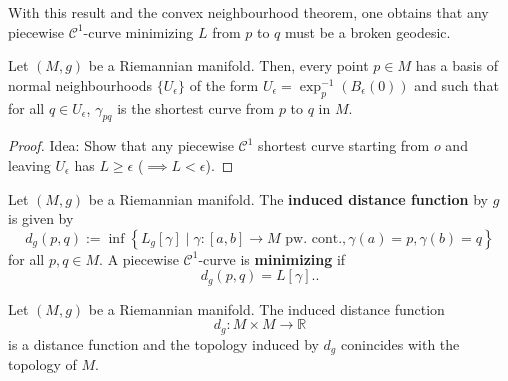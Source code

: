 With this result and the convex neighbourhood theorem, one obtains that any piecewise $\mathcal{C}^1$-curve minimizing $L$ from $p$ to $q$ must be a broken geodesic.
\begin{theorem}
    Let $(M,g)$ be a Riemannian manifold. Then, every point $p\in M$ has a basis of normal neighbourhoods $\{U_\epsilon\}$ of the form $U_\epsilon = \exp_p^{-1}(B_\epsilon(0))$ and such that for all $q \in U_\epsilon$, $\gamma_{pq}$ is the shortest curve from $p$ to $q$ in $M$.
\end{theorem}
\begin{proof}
    Idea: Show that any piecewise $\mathcal{C}^1$ shortest curve starting from $o$ and leaving $U_\epsilon$ has $L \geq \epsilon$ ($\implies L < \epsilon$).
\end{proof}
\begin{definition}
   Let $(M,g)$ be a Riemannian manifold. The \textbf{induced distance function} by $g$ is given by \[
       d_g(p,q):=\inf \left\{ L_g[\gamma] \mid \gamma: [a,b] \to M \text{ pw. cont.,} \, \gamma(a)=p, \gamma(b)=q\right\}
   \] for all $p,q \in M$. A piecewise $\mathcal{C}^1$-curve is \textbf{minimizing} if \[
   d_g(p,q)=L[\gamma].
   .\] 
\end{definition}
\begin{theorem}
    Let $(M,g)$ be a Riemannian manifold. The induced distance function \[d_g: M \times M \to \mathbb{R}\] is a distance function and the topology induced by $d_g$ conincides with the topology of $M$.
\end{theorem}
